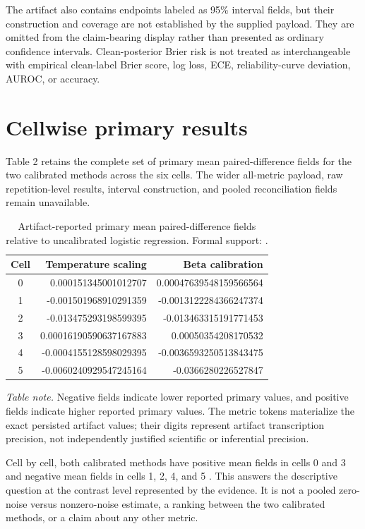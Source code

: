 \documentclass{article}
\begin{document}
The artifact also contains endpoints labeled as 95\% interval fields, but their construction and coverage are not established by the supplied payload. They are omitted from the claim-bearing display rather than presented as ordinary confidence intervals. Clean-posterior Brier risk is not treated as interchangeable with empirical clean-label Brier score, log loss, ECE, reliability-curve deviation, AUROC, or accuracy.

\section{Cellwise primary results}
Table 2 retains the complete set of primary mean paired-difference fields for the two calibrated methods across the six cells. The wider all-metric payload, raw repetition-level results, interval construction, and pooled reconciliation fields remain unavailable.

\begin{table}[ht]
\centering
\caption{Artifact-reported primary mean paired-difference fields relative to uncalibrated logistic regression. Formal support: \cite{exec}.}
\begin{tabular}{crr}
\toprule
Cell & Temperature scaling & Beta calibration\\
\midrule
0 & 0.000151345001012707 & 0.00047639548159566564\\
1 & -0.001501968910291359 & -0.0013122284366247374\\
2 & -0.013475293198599395 & -0.013463315191771453\\
3 & 0.00016190590637167883 & 0.00050354208170532\\
4 & -0.0004155128598029395 & -0.0036593250513843475\\
5 & -0.0060240929547245164 & -0.0366280226527847\\
\bottomrule
\end{tabular}
\end{table}

\noindent\textit{Table note.} Negative fields indicate lower reported primary values, and positive fields indicate higher reported primary values. The metric tokens materialize the exact persisted artifact values; their digits represent artifact transcription precision, not independently justified scientific or inferential precision.

Cell by cell, both calibrated methods have positive mean fields in cells 0 and 3 and negative mean fields in cells 1, 2, 4, and 5 \cite{exec}. This answers the descriptive question at the contrast level represented by the evidence. It is not a pooled zero-noise versus nonzero-noise estimate, a ranking between the two calibrated methods, or a claim about any other metric.
\end{document}
